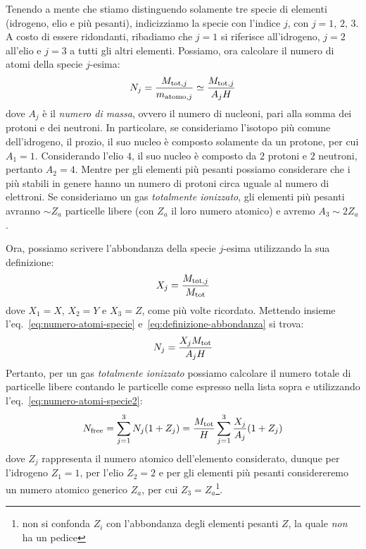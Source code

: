Tenendo a mente che stiamo distinguendo solamente tre specie di elementi (idrogeno, elio e più pesanti), indicizziamo la specie con l'indice $j$, con $j = 1, \, 2, \, 3$. A costo di essere ridondanti, ribadiamo che $j=1$ si riferisce all'idrogeno, $j=2$ all'elio e $j=3$ a tutti gli altri elementi. Possiamo, ora calcolare il numero di atomi della specie $j$-esima:
\begin{equation}\label{eq:numero-atomi-specie}
    N_j = \frac{M_{\textup{tot}, j}}{m_{\textup{atomo}, j}} \simeq \frac{M_{\textup{tot}, j}}{A_j H}
\end{equation}
dove $A_j$ è il \emph{numero di massa}, ovvero il numero di nucleoni, pari alla somma dei protoni e dei neutroni. In particolare, se consideriamo l'isotopo più comune dell'idrogeno, il prozio, il suo nucleo è composto solamente da un protone, per cui $A_1 = 1$. Considerando l'elio $4$, il suo nucleo è composto da $2$ protoni e $2$ neutroni, pertanto $A_2 = 4$. Mentre per gli elementi più pesanti possiamo considerare che i più stabili in genere hanno un numero di protoni circa uguale al numero di elettroni. Se consideriamo un gas \emph{totalmente ionizzato}, gli elementi più pesanti avranno $\sim Z_a$ particelle libere (con $Z_a$ il loro numero atomico) e avremo $A_3 \sim 2 Z_a$.

Ora, possiamo scrivere l'abbondanza della specie $j$-esima utilizzando la sua definizione: 
\begin{equation}\label{eq:definizione-abbondanza}
    X_j = \frac{M_{\textup{tot}, j}}{M_\textup{tot}}
\end{equation}
dove $X_1 = X$, $X_2 = Y$ e $X_3 = Z$, come più volte ricordato. Mettendo insieme l'eq.~\eqref{eq:numero-atomi-specie} e~\eqref{eq:definizione-abbondanza} si trova:
\begin{equation}\label{eq:numero-atomi-specie2}
    N_j =\frac{X_j M_\textup{tot}}{A_j H}
\end{equation}
Pertanto, per un gas \emph{totalmente ionizzato} possiamo calcolare il numero totale di particelle libere contando le particelle come espresso nella lista sopra e utilizzando l'eq.~\eqref{eq:numero-atomi-specie2}:
\begin{equation}\label{eq:numero-atomi-liberi}
    N_\textup{free} = \sum_{j=1}^3 N_j (1 + Z_j) = \frac{M_\textup{tot}}{H} \sum_{j=1}^3 \frac{X_j}{A_j} (1+Z_j)
\end{equation}
dove $Z_j$ rappresenta il numero atomico dell'elemento considerato, dunque per l'idrogeno $Z_1 =1$, per l'elio $Z_2 = 2$ e per gli elementi più pesanti considereremo un numero atomico generico $Z_a$, per cui $Z_3 = Z_a$\footnote{non si confonda $Z_i$ con l'abbondanza degli elementi pesanti $Z$, la quale \emph{non} ha un pedice}. 


